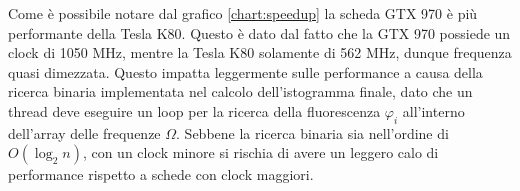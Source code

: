 Come è possibile notare dal grafico \ref{chart:speedup} la scheda
GTX 970 è più performante della Tesla K80. Questo è dato dal fatto che
la GTX 970 possiede un clock di 1050 MHz, mentre la Tesla K80 solamente di
562 MHz, dunque frequenza quasi dimezzata. Questo impatta leggermente sulle
performance a causa della ricerca binaria implementata nel calcolo
dell'istogramma finale, dato che un thread deve eseguire un loop per la ricerca
della fluorescenza $\varphi_{i}$ all'interno dell'array delle frequenze $\Omega$.
Sebbene la ricerca binaria sia nell'ordine di $O(\log_{2}{n})$, con un clock
minore si rischia di avere un leggero calo di performance rispetto a schede
con clock maggiori.
